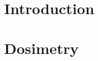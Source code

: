 \documentclass[a4paper]{book}
\begin{document}
	
	
	
	
	
	
	
	\listoffigures
	\listoftables
	\tableofcontents
	\chapterStyleToC
	
	\chapter{Introduction}
	\localtableofcontents
	\begin{chapterabstract}
		
	\end{chapterabstract}
	
	
	\chapter{Dosimetry}
	\localtableofcontents
	\begin{chapterabstract}
		
	\end{chapterabstract}
	
\end{document}
